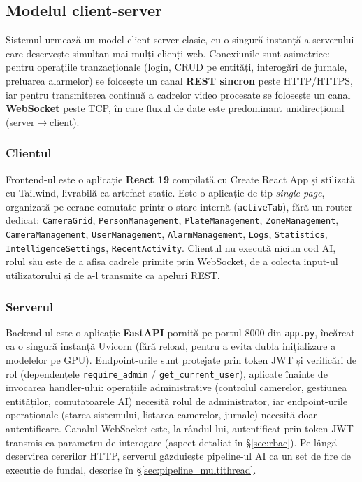 \documentclass[../../main.tex]{subfiles}
\begin{document}
\subsection{Modelul client-server}
\label{subsec:client_server}

Sistemul urmează un model client-server clasic, cu o singură instanță a serverului care deservește simultan mai mulți clienți web. Conexiunile sunt asimetrice: pentru operațiile tranzacționale (login, CRUD pe entități, interogări de jurnale, preluarea alarmelor) se folosește un canal \textbf{REST sincron} peste HTTP/HTTPS, iar pentru transmiterea continuă a cadrelor video procesate se folosește un canal \textbf{WebSocket} peste TCP, în care fluxul de date este predominant unidirecțional (server$\to$client).

\subsubsection{Clientul}

Frontend-ul este o aplicație \textbf{React 19} compilată cu Create React App și stilizată cu Tailwind, livrabilă ca artefact static. Este o aplicație de tip \emph{single-page}, organizată pe ecrane comutate printr-o stare internă (\texttt{activeTab}), fără un router dedicat: \texttt{CameraGrid}, \texttt{PersonManagement}, \texttt{PlateManagement}, \texttt{ZoneManagement}, \texttt{CameraManagement}, \texttt{UserManagement}, \texttt{AlarmManagement}, \texttt{Logs}, \texttt{Statistics}, \texttt{IntelligenceSettings}, \texttt{RecentActivity}. Clientul nu execută niciun cod AI, rolul său este de a afișa cadrele primite prin WebSocket, de a colecta input-ul utilizatorului și de a-l transmite ca apeluri REST.

\subsubsection{Serverul}

Backend-ul este o aplicație \textbf{FastAPI} pornită pe portul 8000 din \texttt{app.py}, încărcat ca o singură instanță Uvicorn (fără reload, pentru a evita dubla inițializare a modelelor pe GPU). Endpoint-urile sunt protejate prin token JWT și verificări de rol (dependențele \texttt{require\_admin} / \texttt{get\_current\_user}), aplicate înainte de invocarea handler-ului: operațiile administrative (controlul camerelor, gestiunea entităților, comutatoarele AI) necesită rolul de administrator, iar endpoint-urile operaționale (starea sistemului, listarea camerelor, jurnale) necesită doar autentificare. Canalul WebSocket este, la rândul lui, autentificat prin token JWT transmis ca parametru de interogare (aspect detaliat în \S\ref{sec:rbac}). Pe lângă deservirea cererilor HTTP, serverul găzduiește pipeline-ul AI ca un set de fire de execuție de fundal, descrise în \S\ref{sec:pipeline_multithread}.
\end{document}
